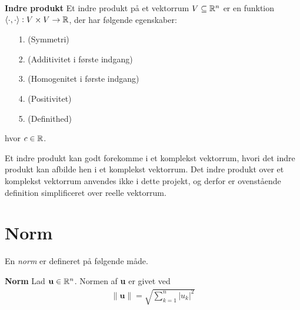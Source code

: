 \begin{defn}\textbf{Indre produkt}\label{indre_produkt_defn}
    \newline
    Et indre produkt på et vektorrum $V \subseteq \mathbb{R}^n$ er en funktion ${\langle \cdot,\cdot \rangle}: V \times V \to \mathbb{R}$, der har følgende egenskaber:\\
    \begin{itemize}
        \item[1.]{} \quad (Symmetri)
         \item[2.]{} \quad (Additivitet i første indgang)
         \item[3.]{} \quad (Homogenitet i første indgang)
         \item[4.]{} \quad (Positivitet)
         \item[5.]{} \quad (Definithed)
    \end{itemize}
    hvor $c \in \mathbb{R}$.
\end{defn}

Et indre produkt kan godt forekomme i et komplekst vektorrum, hvori det indre produkt kan afbilde hen i et komplekst vektorrum. Det indre produkt over et komplekst vektorrum anvendes ikke i dette projekt, og derfor er ovenstående definition simplificeret over reelle vektorrum.

\section{Norm}
En \textit{norm} er defineret på følgende måde.
\begin{defn}\textbf{Norm}\label{def:norm} %
\newline
Lad $\textbf{u} \in \mathbb{R}^n$. Normen af \textbf{u} er givet ved 
\begin{align*}
    \|\mathbf{u}\| = \sqrt{\sum^n_{k=1}|u_k|^2}
\end{align*}
\end{defn}


